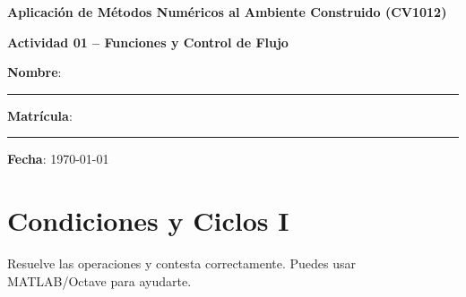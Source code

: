 \documentclass[spanish, 10pt]{article}
\begin{document}
\begin{center}
	{\Large \textbf{Aplicación de Métodos Numéricos al Ambiente Construido (CV1012)}}
	
	\bigskip
	{\large \textbf{Actividad 01 -- Funciones y Control de Flujo}}
\end{center}

\bigskip
{\large \textbf{Nombre}: \rule{13.7 cm}{0.4mm}}



\bigskip
{\large \textbf{Matrícula}: \rule{5 cm}{0.4mm}} \hfill {\large \textbf{Fecha}: \today}

\bigskip

\section{Condiciones y Ciclos I}

Resuelve las operaciones y contesta correctamente. Puedes usar MATLAB/Octave para ayudarte.
\end{document}
